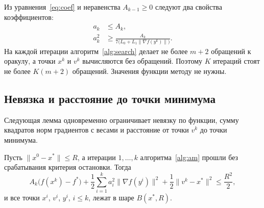 \documentclass[11pt,a4paper]{article}
\newcommand{\norm}[1]{\|#1\|}
\begin{document}
Из уравнения~\eqref{eq:coef} и неравенства $A_{k-1}\ge0$ следуют два свойства коэффициентов:
\begin{equation}\label{eq:coef-basic}
\begin{aligned}
 a_k&\le A_k,\\
 a_k^2&\ge\frac{A_k}{7\bigl(L_0+L_1\norm{\nabla f(y^k)}\bigr)} .
\end{aligned}
\end{equation}
На каждой итерации алгоритм~\ref{alg:search} делает не более $m+2$ обращений к оракулу, а точки $x^k$ и $v^k$ вычисляются без обращений. Поэтому $K$ итераций стоят не более $K(m+2)$ обращений. Значения функции методу не нужны.

\subsection{Невязка и расстояние до точки минимума}\label{sec:upper-energy}

Следующая лемма одновременно ограничивает невязку по функции, сумму квадратов норм градиентов с весами и расстояние от точки $v^k$ до точки минимума.

\begin{lemma}\label{lem:energy}
Пусть $\norm{x^0-x^\ast}\le R$, а итерации $1,\dots,k$ алгоритма~\ref{alg:am} прошли без срабатывания критерия остановки. Тогда
\begin{equation}\label{eq:energy}
 A_k\bigl(f(x^k)-f^\ast\bigr)+\frac12\sum_{i=1}^ka_i^2\norm{\nabla f(y^i)}^2+\frac12\norm{v^k-x^\ast}^2\le\frac{R^2}2 ,
\end{equation}
и все точки $x^i$, $v^i$, $y^i$, $i\le k$, лежат в шаре $B(x^\ast,R)$.
\end{lemma}
\end{document}
